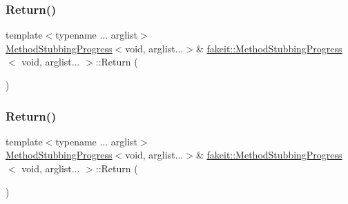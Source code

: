 \mbox{\label{structfakeit_1_1MethodStubbingProgress_3_01void_00_01arglist_8_8_8_01_4_ada79edce54db3ffaa88985829f9b5558}} 
\subsubsection{\texorpdfstring{Return()}{Return()}\hspace{0.1cm}{\footnotesize\ttfamily [4/18]}}
{\footnotesize\ttfamily template$<$typename ... arglist$>$ \\
\mbox{\hyperlink{structfakeit_1_1MethodStubbingProgress}{Method\+Stubbing\+Progress}}$<$void, arglist...$>$\& \mbox{\hyperlink{structfakeit_1_1MethodStubbingProgress}{fakeit\+::\+Method\+Stubbing\+Progress}}$<$ void, arglist... $>$\+::Return (\begin{DoxyParamCaption}{ }\end{DoxyParamCaption})\hspace{0.3cm}{\ttfamily [inline]}}

\mbox{\label{structfakeit_1_1MethodStubbingProgress_3_01void_00_01arglist_8_8_8_01_4_ada79edce54db3ffaa88985829f9b5558}} 
\subsubsection{\texorpdfstring{Return()}{Return()}\hspace{0.1cm}{\footnotesize\ttfamily [5/18]}}
{\footnotesize\ttfamily template$<$typename ... arglist$>$ \\
\mbox{\hyperlink{structfakeit_1_1MethodStubbingProgress}{Method\+Stubbing\+Progress}}$<$void, arglist...$>$\& \mbox{\hyperlink{structfakeit_1_1MethodStubbingProgress}{fakeit\+::\+Method\+Stubbing\+Progress}}$<$ void, arglist... $>$\+::Return (\begin{DoxyParamCaption}{ }\end{DoxyParamCaption})\hspace{0.3cm}{\ttfamily [inline]}}

